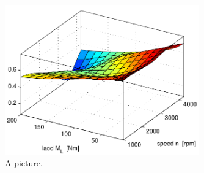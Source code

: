 \begin{figure}[h]
   \centering
   \includegraphics[width=0.75\textwidth]{pics/k_surf.pdf}
   \caption{A picture.}
   \label{pics:k_surf}
\end{figure}

